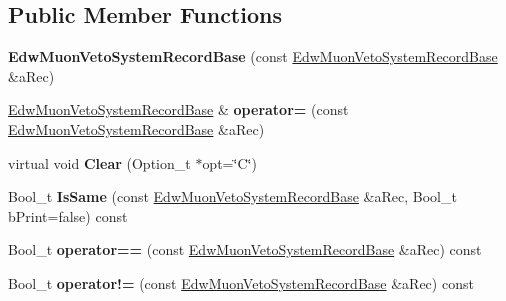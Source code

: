 \subsection*{Public Member Functions}
\begin{DoxyCompactItemize}
\item 
\hypertarget{class_edw_muon_veto_system_record_base_afb993ce3f6dfe160061218874e60ef5e}{
{\bfseries EdwMuonVetoSystemRecordBase} (const \hyperlink{class_edw_muon_veto_system_record_base}{EdwMuonVetoSystemRecordBase} \&aRec)}
\label{class_edw_muon_veto_system_record_base_afb993ce3f6dfe160061218874e60ef5e}

\item 
\hypertarget{class_edw_muon_veto_system_record_base_a9bc454018d5d6824fdaeb757fee5a130}{
\hyperlink{class_edw_muon_veto_system_record_base}{EdwMuonVetoSystemRecordBase} \& {\bfseries operator=} (const \hyperlink{class_edw_muon_veto_system_record_base}{EdwMuonVetoSystemRecordBase} \&aRec)}
\label{class_edw_muon_veto_system_record_base_a9bc454018d5d6824fdaeb757fee5a130}

\item 
\hypertarget{class_edw_muon_veto_system_record_base_ac2ed957cacd627894b61dd33f839f1c4}{
virtual void {\bfseries Clear} (Option\_\-t $\ast$opt=\char`\"{}C\char`\"{})}
\label{class_edw_muon_veto_system_record_base_ac2ed957cacd627894b61dd33f839f1c4}

\item 
\hypertarget{class_edw_muon_veto_system_record_base_a509d5b7113e8f587f73075e40bb7d459}{
Bool\_\-t {\bfseries IsSame} (const \hyperlink{class_edw_muon_veto_system_record_base}{EdwMuonVetoSystemRecordBase} \&aRec, Bool\_\-t bPrint=false) const }
\label{class_edw_muon_veto_system_record_base_a509d5b7113e8f587f73075e40bb7d459}

\item 
\hypertarget{class_edw_muon_veto_system_record_base_a7a1f803f9f18461fab65e7920b4c7c48}{
Bool\_\-t {\bfseries operator==} (const \hyperlink{class_edw_muon_veto_system_record_base}{EdwMuonVetoSystemRecordBase} \&aRec) const }
\label{class_edw_muon_veto_system_record_base_a7a1f803f9f18461fab65e7920b4c7c48}

\item 
\hypertarget{class_edw_muon_veto_system_record_base_a7d4f120c20dc10cd2eafc6f769f6aee7}{
Bool\_\-t {\bfseries operator!=} (const \hyperlink{class_edw_muon_veto_system_record_base}{EdwMuonVetoSystemRecordBase} \&aRec) const }
\label{class_edw_muon_veto_system_record_base_a7d4f120c20dc10cd2eafc6f769f6aee7}


\end{DoxyCompactItemize}
